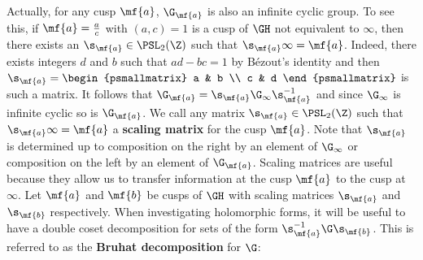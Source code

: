       Actually, for any cusp $\mf{a}$, $\G_{\mf{a}}$ is also an infinite cyclic group. To see this, if $\mf{a} = \frac{a}{c}$ with $(a,c) = 1$ is a cusp of $\GH$ not equivalent to $\infty$, then there exists an $\s_{\mf{a}} \in \PSL_{2}(\Z)$ such that $\s_{\mf{a}}\infty = \mf{a}$. Indeed, there exists integers $d$ and $b$ such that $ad-bc = 1$ by B\'ezout's identity and then $\s_{\mf{a}} = \begin{psmallmatrix} a & b \\ c & d \end{psmallmatrix}$ is such a matrix. It follows that $\G_{\mf{a}} = \s_{\mf{a}}\G_{\infty}\s_{\mf{a}}^{-1}$ and since $\G_{\infty}$ is infinite cyclic so is $\G_{\mf{a}}$. We call any matrix $\s_{\mf{a}} \in \PSL_{2}(\Z)$ such that $\s_{\mf{a}}\infty = \mf{a}$ a \textbf{scaling matrix} for the cusp $\mf{a}$. Note that $\s_{\mf{a}}$ is determined up to composition on the right by an element of $\G_{\infty}$ or composition on the left by an element of $\G_{\mf{a}}$. Scaling matrices are useful because they allow us to transfer information at the cusp $\mf{a}$ to the cusp at $\infty$. Let $\mf{a}$ and $\mf{b}$ be cusps of $\GH$ with scaling matrices $\s_{\mf{a}}$ and $\s_{\mf{b}}$ respectively. When investigating holomorphic forms, it will be useful to have a double coset decomposition for sets of the form $\s_{\mf{a}}^{-1}\G\s_{\mf{b}}$. This is referred to as the \textbf{Bruhat decomposition} for $\G$:

